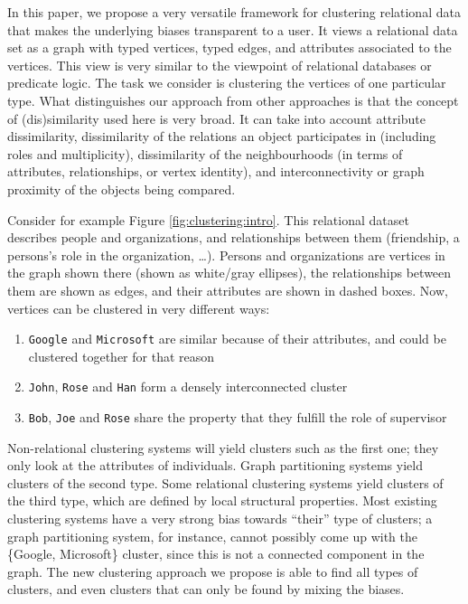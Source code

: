 In this paper, we propose a very versatile framework for clustering relational data that makes the underlying biases transparent to a user.  
It views a relational data set as a graph with typed vertices, typed edges, and attributes associated to the vertices.  
This view is very similar to the viewpoint of relational databases or predicate logic.  
The task we consider is clustering the vertices of one particular type. 
What distinguishes our approach from other approaches is that the concept of (dis)similarity used here is very broad.  
It can take into account attribute dissimilarity, dissimilarity of the relations an object participates in (including roles and multiplicity), dissimilarity of the neighbourhoods (in terms of attributes, relationships, or vertex identity), and interconnectivity or graph proximity of the objects being compared. 


Consider for example Figure \ref{fig:clustering:intro}.
This relational dataset describes people and organizations, and relationships between them (friendship, a persons’s role in the organization, \ldots).   
Persons and organizations are vertices in the graph shown there (shown as white/gray ellipses), the relationships between them are shown as edges, and their attributes are shown in dashed boxes.  
Now, vertices can be clustered in very different ways:
\begin{enumerate}
    \item {\tt Google} and {\tt Microsoft} are similar because of their attributes, and could be clustered together for that reason
    \item {\tt John}, {\tt Rose} and {\tt Han} form a densely interconnected cluster
    \item {\tt Bob}, {\tt Joe} and {\tt Rose} share the property that they fulfill the role of supervisor
\end{enumerate}
Non-relational clustering systems will yield clusters such as the first one; they only look at the attributes of individuals.  
Graph partitioning systems yield clusters of the second type.  
Some relational clustering systems yield clusters of the third type, which are defined by local structural properties.  
Most existing clustering systems have a very strong bias towards ``their'' type of clusters; a graph partitioning system, for instance, cannot possibly come up with the \{Google, Microsoft\} cluster, since this is not a connected component in the graph.  
The new clustering approach we propose is able to find all types of clusters, and even clusters that can only be found by mixing the biases.








